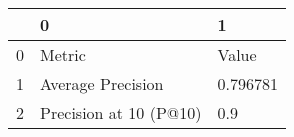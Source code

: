 \begin{tabular}{lll}
\toprule
{} &                       0 &         1 \\
\midrule
0 &                  Metric &     Value \\
1 &       Average Precision &  0.796781 \\
2 &  Precision at 10 (P@10) &       0.9 \\
\bottomrule
\end{tabular}
